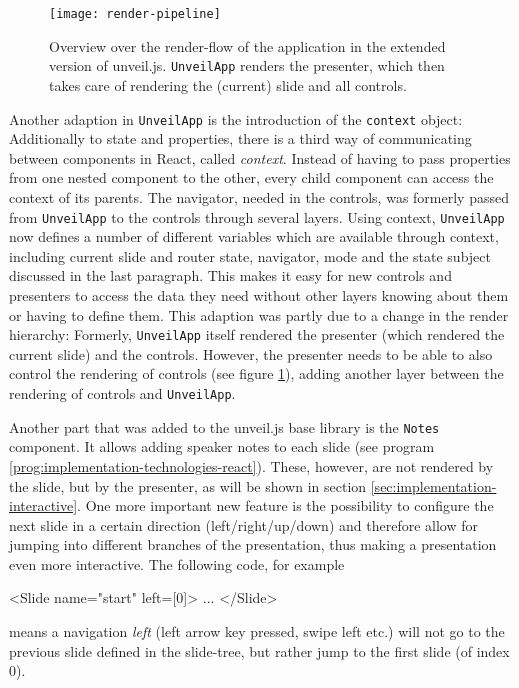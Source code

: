 \begin{figure}
\centering
\texttt{[image: render-pipeline]}
\caption{Overview over the render-flow of the application in the extended version of unveil.js. \texttt{UnveilApp} renders the presenter, which then takes care of rendering the (current) slide and all controls.}
\label{fig:implementation-unveil-render-pipeline}
\end{figure}

Another adaption in \texttt{UnveilApp} is the introduction of the \texttt{context} object: Additionally to state and properties, there is a third way of communicating between components in React, called \emph{context}. Instead of having to pass properties from one nested component to the other, every child component can access the context of its parents. The navigator, needed in the controls, was formerly passed from \texttt{UnveilApp} to the controls through several layers. Using context, \texttt{UnveilApp} now defines a number of different variables which are available through context, including current slide and router state, navigator, mode and the state subject discussed in the last paragraph. This makes it easy for new controls and presenters to access the data they need without other layers knowing about them or having to define them.
This adaption was partly due to a change in the render hierarchy: Formerly, \texttt{UnveilApp} itself rendered the presenter (which rendered the current slide) and the controls. However, the presenter needs to be able to also control the rendering of controls (see figure \ref{fig:implementation-unveil-render-pipeline}), adding another layer between the rendering of controls and \texttt{UnveilApp}.

Another part that was added to the unveil.js base library is the \texttt{Notes} component. It allows adding speaker notes to each slide (see program \ref{prog:implementation-technologies-react}). These, however, are not rendered by the slide, but by the presenter, as will be shown in section \ref{sec:implementation-interactive}. One more important new feature is the possibility to configure the next slide in a certain direction (left/right/up/down) and therefore allow for jumping into different branches of the presentation, thus making a presentation even more interactive. The following code, for example
%
\begin{JsCode}
  <Slide name="start" left={[0]}>
    ...
  </Slide>
\end{JsCode}
%
means a navigation \emph{left} (left arrow key pressed, swipe left etc.) will not go to the previous slide defined in the slide-tree, but rather jump to the first slide (of index $0$).


